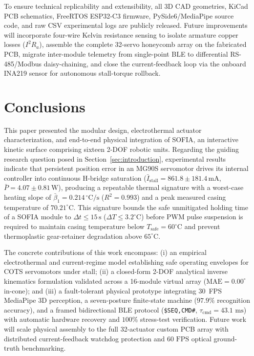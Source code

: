 \documentclass[lettersize,journal]{IEEEtran}
\begin{document}
	To ensure technical replicability and extensibility,
	all 3D CAD geometries, KiCad PCB schematics, FreeRTOS ESP32-C3 firmware,
	PySide6/MediaPipe source code, and raw CSV experimental logs are publicly
	released. Future improvements will incorporate four-wire Kelvin resistance
	sensing to isolate armature copper losses ($I^2 R_a$), assemble the complete
	32-servo honeycomb array on the fabricated PCB, migrate inter-module
	telemetry from single-point BLE to differential RS-485/Modbus daisy-chaining,
	and close the current-feedback loop via the onboard INA219 sensor for
	autonomous stall-torque rollback.
	
	\section{Conclusions}
	\label{sec:conclusions}
	
	This paper presented the modular design, electrothermal
	actuator characterization, and end-to-end physical integration of SOFIA, an
	interactive kinetic surface comprising sixteen 2-DOF robotic units. Regarding
	the guiding research question posed in Section~\ref{sec:introduction},
	experimental results indicate that persistent position error
	in an MG90S servomotor drives its internal controller into
	continuous H-bridge saturation ($\bar{I}_{\text{stall}} = 861.8 \pm 181.4\,\text{mA}$,
	$\bar{P} = 4.07 \pm 0.81\,\text{W}$),
	producing a repeatable thermal signature with a worst-case heating slope of
	$\bar{\beta}_1 = 0.214\,^\circ\text{C/s}$ ($R^2 = 0.993$) and a peak measured
	casing temperature of $70.21^\circ\text{C}$.
	This signature bounds the safe unmitigated holding time of a SOFIA module to
	$\Delta t \le 15\,\text{s}$ ($\Delta T \le 3.2^\circ\text{C}$) before PWM
	pulse suspension is required to maintain casing temperature below
	$T_{\text{safe}} = 60^\circ\text{C}$ and prevent thermoplastic gear-retainer
	degradation above $65^\circ\text{C}$.
	
	The concrete contributions of this work encompass: (i) an empirical
	electrothermal and current-regime model establishing safe operating envelopes
	for COTS servomotors under stall; (ii) a closed-form 2-DOF analytical inverse
	kinematics formulation validated across a 16-module virtual array ($\text{MAE} = 0.00^\circ$ in-cone); and
	(iii) a fault-tolerant physical prototype integrating 30~FPS MediaPipe 3D
	perception, a seven-posture finite-state machine ($97.9\%$ recognition accuracy), and a framed bidirectional
	BLE protocol (\texttt{\$SEQ,CMD\#}, $\tau_{\text{cmd}} = 43.1\text{ ms}$) with automatic hardware recovery and
	$100\%$ stress-test verification. Future work will scale physical assembly to
	the full 32-actuator custom PCB array with distributed current-feedback
	watchdog protection and $60\text{ FPS}$ optical ground-truth benchmarking.
	
\end{document}
